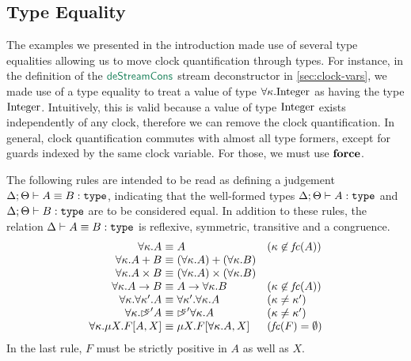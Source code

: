 \subsection{Type Equality}
\label{sec:type-equality}

The examples we presented in the introduction made use of several type
equalities allowing us to move clock quantification through types. For
instance, in the definition of the $\elim{deStreamCons}$ stream
deconstructor in \autoref{sec:clock-vars}, we made use of a type
equality to treat a value of type $\forall \kappa. \textrm{Integer}$
as having the type $\textrm{Integer}$. Intuitively, this is valid
because a value of type $\textrm{Integer}$ exists independently of any
clock, therefore we can remove the clock quantification. In general,
clock quantification commutes with almost all type formers, except for
guards indexed by the same clock variable. For those, we must use
$\textbf{force}$.

The following rules are intended to be read as defining a judgement
$\Delta; \Theta \vdash A \equiv B : \texttt{\textup{type}}$, indicating that the
well-formed types $\Delta; \Theta \vdash A : \texttt{\textup{type}}$ and $\Delta;
\Theta \vdash B : \texttt{\textup{type}}$ are to be considered equal. In addition
to these rules, the relation $\Delta \vdash A \equiv B : \texttt{\textup{type}}$ is
reflexive, symmetric, transitive and a congruence.
\begin{displaymath}
  \begin{array}{r@{\hspace{0.3em}}c@{\hspace{0.3em}}ll}
    \forall \kappa. A & \equiv & A & (\kappa \not\in \mathit{fc}(A)) \\
    \forall \kappa. A + B & \equiv & (\forall \kappa. A) + (\forall \kappa. B) \\
    \forall \kappa.  A \times B & \equiv & (\forall \kappa. A) \times (\forall \kappa. B) \\
    \forall \kappa. A \to B & \equiv & A \to \forall \kappa. B & (\kappa \not\in \mathit{fc}(A)) \\
    \forall \kappa. \forall \kappa'. A & \equiv & \forall \kappa'. \forall \kappa. A & (\kappa \not= \kappa') \\
    \forall \kappa. \delay\kappa' A & \equiv & \delay\kappa'\forall \kappa. A & (\kappa \not= \kappa') \\
    \forall \kappa. \mu X. F[A,X] & \equiv & \mu X. F[\forall \kappa. A,X] & (\mathit{fc}(F) = \emptyset)
  \end{array}
\end{displaymath}
In the last rule, $F$ must be strictly positive in $A$ as well as $X$.


